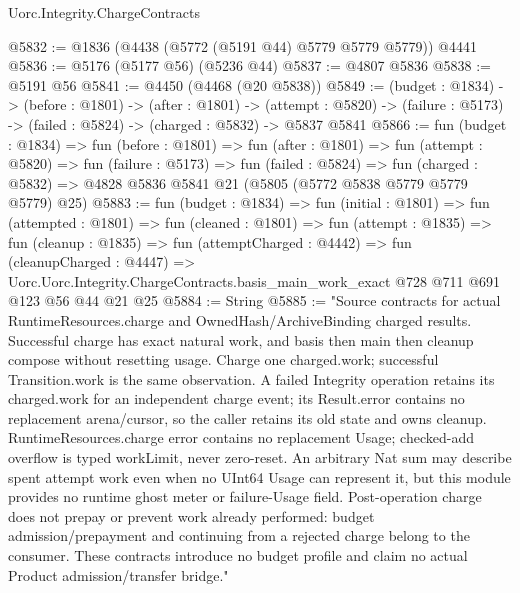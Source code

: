 \begin{lexlean}{Uorc.Integrity.ChargeContracts}
\begin{coremodule}
@5832 := @1836 (@4438 (@5772 (@5191 @44) @5779 @5779 @5779)) @4441
@5836 := @5176 (@5177 @56) (@5236 @44)
@5837 := @4807 @5836
@5838 := @5191 @56
@5841 := @4450 (@4468 (@20 @5838))
@5849 := (budget : @1834) ->
  (before : @1801) ->
  (after : @1801) ->
  (attempt : @5820) -> (failure : @5173) -> (failed : @5824) -> (charged : @5832) -> @5837 @5841
@5866 := fun (budget : @1834) =>
  fun (before : @1801) =>
  fun (after : @1801) =>
  fun (attempt : @5820) =>
  fun (failure : @5173) =>
  fun (failed : @5824) =>
  fun (charged : @5832) => @4828 @5836 @5841 @21 (@5805 (@5772 @5838 @5779 @5779 @5779) @25)
@5883 := fun (budget : @1834) =>
  fun (initial : @1801) =>
  fun (attempted : @1801) =>
  fun (cleaned : @1801) =>
  fun (attempt : @1835) =>
  fun (cleanup : @1835) =>
  fun (attemptCharged : @4442) =>
  fun (cleanupCharged : @4447) =>
  Uorc.Uorc.Integrity.ChargeContracts.basis_main_work_exact @728 @711 @691 @123 @56 @44 @21 @25
@5884 := String
@5885 := "Source contracts for actual RuntimeResources.charge and OwnedHash/ArchiveBinding charged results. Successful charge has exact natural work, and basis then main then cleanup compose without resetting usage. Charge one charged.work; successful Transition.work is the same observation. A failed Integrity operation retains its charged.work for an independent charge event; its Result.error contains no replacement arena/cursor, so the caller retains its old state and owns cleanup. RuntimeResources.charge error contains no replacement Usage; checked-add overflow is typed workLimit, never zero-reset. An arbitrary Nat sum may describe spent attempt work even when no UInt64 Usage can represent it, but this module provides no runtime ghost meter or failure-Usage field. Post-operation charge does not prepay or prevent work already performed: budget admission/prepayment and continuing from a rejected charge belong to the consumer. These contracts introduce no budget profile and claim no actual Product admission/transfer bridge."
\end{coremodule}
\end{lexlean}
